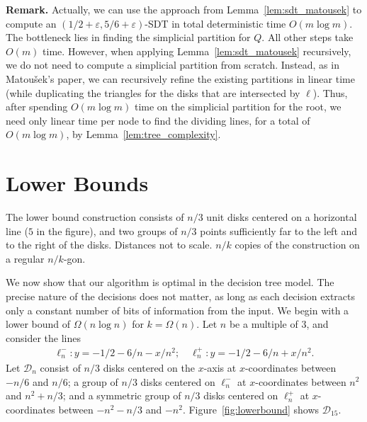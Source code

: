 \documentclass{paper}
\newcommand {\eps} {\varepsilon}
\newcommand {\script} [1] {\ensuremath {\mathcal {#1}}}
\newcommand {\D} {\script {D}}
\begin{document}
\noindent\textbf{Remark.} Actually, we can use the approach from 
Lemma~\ref{lem:sdt_matousek} to compute an $(1/2 + \eps, 5/6 + \eps)$-SDT in 
total deterministic time $O(m \log m)$. The bottleneck 
lies in finding the simplicial partition for $Q$. All other steps take $O(m)$ time.
However, when applying Lemma~\ref{lem:sdt_matousek} recursively, we do not need
to compute a simplicial partition from scratch. Instead, as in Matou\v{s}ek's paper,
we can recursively refine the existing partitions in linear 
time~\cite[Corollary~3.5]{Matousek92} (while duplicating the triangles for the
disks that are intersected by $\ell$). Thus, after spending $O(m \log m)$ time
on the simplicial partition for the root, we need only linear time per
node to find the dividing lines, for a total of $O(m \log m)$, by 
Lemma~\ref{lem:tree_complexity}.


\section{Lower Bounds}

 {The lower bound construction 
consists of $n/3$ unit disks centered on a horizontal line 
($5$ in the figure), and two groups of $n/3$ points sufficiently far 
to the left and to the right of the disks.
Distances not to scale.}
 {$n/k$ copies of the construction on a 
regular $n/k$-gon. 
}

We now show that 
our algorithm is optimal in the decision tree model. 
The precise nature of the decisions does not matter, 
as long as each decision extracts only a constant number
of bits of information from the input.
We begin with a lower bound of $\Omega(n \log n)$ for $k = \Omega(n)$.
Let $n$ be a multiple of $3$, and consider the lines 
\begin{align*}
\ell_n^- : y = -1/2 -6/n -x/n^2 ;\quad 
\ell_n^+ : y = -1/2 - 6/n +x/n^2 .
\end{align*}
Let $\D_n$ consist 
of $n/3$ disks centered on the $x$-axis at $x$-coordinates 
between $-n/6$ and $n/6$;
a group of $n/3$ disks centered on $\ell_n^-$ at $x$-coordinates 
between $n^2$ and $n^2 + n/3$;
and a symmetric group of $n/3$ disks centered on 
$\ell_n^+$ at $x$-coordinates between $-n^2 - n/3$ and $-n^2$.
Figure~\ref {fig:lowerbound} shows $\D_{15}$.
\end{document}
